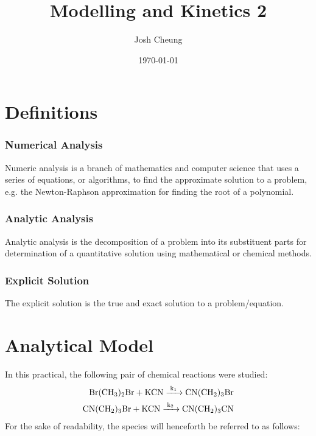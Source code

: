 \documentclass[twoside, 11pt]{article}
\title{Modelling and Kinetics 2}
\author{Josh Cheung}
\date{\numdate\today}
\begin{document}
\setlength{\parindent}{0cm}
\pagestyle{fancy}
\thispagestyle{plain}
\titlespacing*{\section}{0pt}{4pt}{4pt}
\titlespacing*{\subsection}{0pt}{15pt}{1pt}
\renewcommand{\figurename}{\small{Fig.}~}

\fancyfoot{}
\fancyhead{}
\renewcommand{\headrulewidth}{0pt} 
\renewcommand{\footrulewidth}{0pt}

\maketitle
\section{Definitions}
\label{sec:definitions}
\subsubsection*{Numerical Analysis}
Numeric analysis is a branch of mathematics\cite{num_analysis_matlab} and computer science\cite{num_analysis_britannica} that uses a series of equations, or algorithms, to find the approximate solution to a problem, e.g. the Newton-Raphson approximation for finding the root of a polynomial\cite{newton-raphson}.
\subsubsection*{Analytic Analysis}
Analytic analysis is the decomposition of a problem into its substituent parts\cite{analytical} for determination of a quantitative solution using mathematical or chemical methods.
\subsubsection*{Explicit Solution}
The explicit solution is the true and exact solution to a problem/equation\cite{explicit}.
\section{Analytical Model}
\label{sec:Analytical}
In this practical, the following pair of chemical reactions were studied:
\begin{align}
    \ce{Br(CH3)2Br + KCN ->[k_1] CN(CH2)3Br}\\
    \ce{CN(CH2)3Br + KCN ->[k_2] CN(CH2)3CN}
\end{align} 
For the sake of readability, the species will henceforth be referred to as follows:
\end{document}
